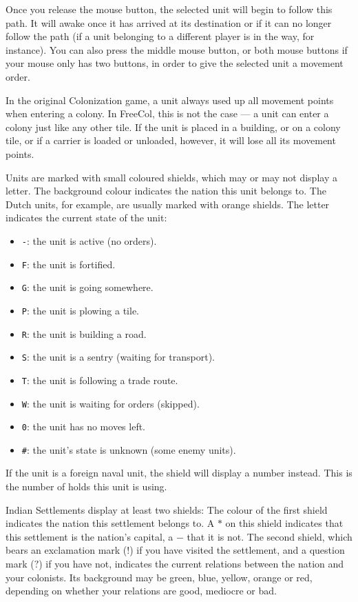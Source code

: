 \documentclass[12pt]{book}
\begin{document}
Once you release the mouse button, the selected unit will begin to
follow this path. It will awake once it has arrived at its destination
or if it can no longer follow the path (if a unit belonging to a
different player is in the way, for instance). You can also press the
middle mouse button, or both mouse buttons if your mouse only has two
buttons, in order to give the selected unit a movement order.

In the original Colonization game, a unit always used up all movement
points when entering a colony. In FreeCol, this is not the case --- a
unit can enter a colony just like any other tile. If the unit is
placed in a building, or on a colony tile, or if a carrier is loaded
or unloaded, however, it will lose all its movement points.

Units are marked with small coloured shields, which may or may not
display a letter. The background colour indicates the nation this unit
belongs to. The Dutch units, for example, are usually marked with
orange shields. The letter indicates the current state of the unit:

\pagebreak[2]
\begin{itemize}
\item\verb$-$: the unit is active (no orders).
\item\verb$F$: the unit is fortified.
\item\verb$G$: the unit is going somewhere.
\item\verb$P$: the unit is plowing a tile.
\item\verb$R$: the unit is building a road.
\item\verb$S$: the unit is a sentry (waiting for transport).
\item\verb$T$: the unit is following a trade route.
\item\verb$W$: the unit is waiting for orders (skipped).
\item\verb$0$: the unit has no moves left.
\item\verb$#$: the unit's state is unknown (some enemy units).
\end{itemize}

If the unit is a foreign naval unit, the shield will display a number
instead. This is the number of holds this unit is using.

Indian Settlements display at least two shields: The colour of the
first shield indicates the nation this settlement belongs to. A $*$ on
this shield indicates that this settlement is the nation's capital, a
$-$ that it is not. The second shield, which bears an exclamation mark
($!$) if you have visited the settlement, and a question mark ($?$) if
you have not, indicates the current relations between the nation and
your colonists. Its background may be green, blue, yellow, orange or
red, depending on whether your relations are good, mediocre or bad.
\end{document}
